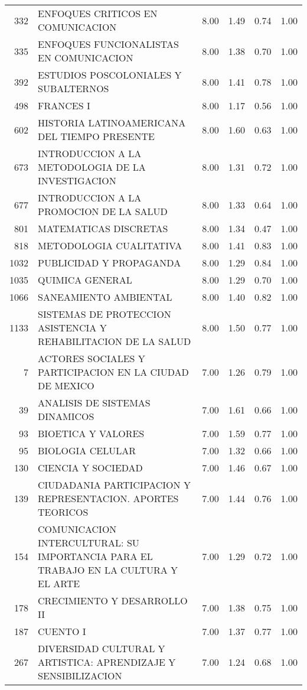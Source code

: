 \documentclass[12pt]{article}
\begin{document}
\begin{table}[ht]
\begin{tabular}{rlrrrr}
  332 & ENFOQUES CRITICOS EN COMUNICACION & 8.00 & 1.49 & 0.74 & 1.00 \\ 
  335 & ENFOQUES FUNCIONALISTAS EN COMUNICACION & 8.00 & 1.38 & 0.70 & 1.00 \\ 
  392 & ESTUDIOS POSCOLONIALES Y SUBALTERNOS & 8.00 & 1.41 & 0.78 & 1.00 \\ 
  498 & FRANCES I & 8.00 & 1.17 & 0.56 & 1.00 \\ 
  602 & HISTORIA LATINOAMERICANA DEL TIEMPO PRESENTE & 8.00 & 1.60 & 0.63 & 1.00 \\ 
  673 & INTRODUCCION A LA METODOLOGIA DE LA INVESTIGACION & 8.00 & 1.31 & 0.72 & 1.00 \\ 
  677 & INTRODUCCION A LA PROMOCION DE LA SALUD & 8.00 & 1.33 & 0.64 & 1.00 \\ 
  801 & MATEMATICAS DISCRETAS & 8.00 & 1.34 & 0.47 & 1.00 \\ 
  818 & METODOLOGIA CUALITATIVA & 8.00 & 1.41 & 0.83 & 1.00 \\ 
  1032 & PUBLICIDAD Y PROPAGANDA & 8.00 & 1.29 & 0.84 & 1.00 \\ 
  1035 & QUIMICA GENERAL & 8.00 & 1.29 & 0.70 & 1.00 \\ 
  1066 & SANEAMIENTO AMBIENTAL & 8.00 & 1.40 & 0.82 & 1.00 \\ 
  1133 & SISTEMAS DE PROTECCION ASISTENCIA Y REHABILITACION DE LA SALUD & 8.00 & 1.50 & 0.77 & 1.00 \\ 
  7 & ACTORES SOCIALES Y PARTICIPACION EN LA CIUDAD DE MEXICO & 7.00 & 1.26 & 0.79 & 1.00 \\ 
  39 & ANALISIS DE SISTEMAS DINAMICOS & 7.00 & 1.61 & 0.66 & 1.00 \\ 
  93 & BIOETICA Y VALORES & 7.00 & 1.59 & 0.77 & 1.00 \\ 
  95 & BIOLOGIA CELULAR & 7.00 & 1.32 & 0.66 & 1.00 \\ 
  130 & CIENCIA Y SOCIEDAD & 7.00 & 1.46 & 0.67 & 1.00 \\ 
  139 & CIUDADANIA PARTICIPACION Y REPRESENTACION. APORTES TEORICOS & 7.00 & 1.44 & 0.76 & 1.00 \\ 
  154 & COMUNICACION INTERCULTURAL: SU IMPORTANCIA PARA EL TRABAJO EN LA CULTURA Y EL ARTE & 7.00 & 1.29 & 0.72 & 1.00 \\ 
  178 & CRECIMIENTO Y DESARROLLO II & 7.00 & 1.38 & 0.75 & 1.00 \\ 
  187 & CUENTO I & 7.00 & 1.37 & 0.77 & 1.00 \\ 
  267 & DIVERSIDAD CULTURAL Y ARTISTICA: APRENDIZAJE Y SENSIBILIZACION & 7.00 & 1.24 & 0.68 & 1.00 \\ 

\end{tabular}
\end{table}
\end{document}
